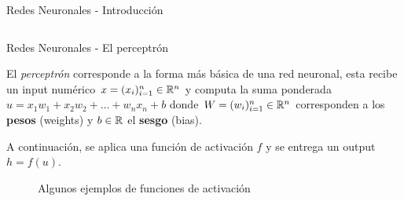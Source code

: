 \documentclass[9pt]{beamer}
\begin{document}
\begin{frame}{Redes Neuronales - Introducción}
\begin{columns}
\begin{column}{0.5\textwidth}
  \end{column}

\end{columns}

\end{frame}

\begin{frame}{Redes Neuronales - El perceptrón}

El \textit{perceptrón} corresponde a la forma más básica de una red neuronal, esta recibe un input numérico $x = (x_i)_{i=1}^n \in \mathbb{R}^n$ y computa la suma ponderada $u = x_1w_1 + x_2w_2 + \dots + w_nx_n + b$ donde $W = (w_i)_{i=1}^n \in \mathbb{R}^n$ corresponden a los \textbf{pesos} (weights) y $b \in \mathbb{R}$ el \textbf{sesgo} (bias). \pause 

A continuación, se aplica una función de activación $f$ y se entrega un output $h = f(u)$. \pause 
\begin{figure}[H]
  \centering
  \caption{Algunos ejemplos de funciones de activación}
\end{figure}

\end{frame}
\end{document}
